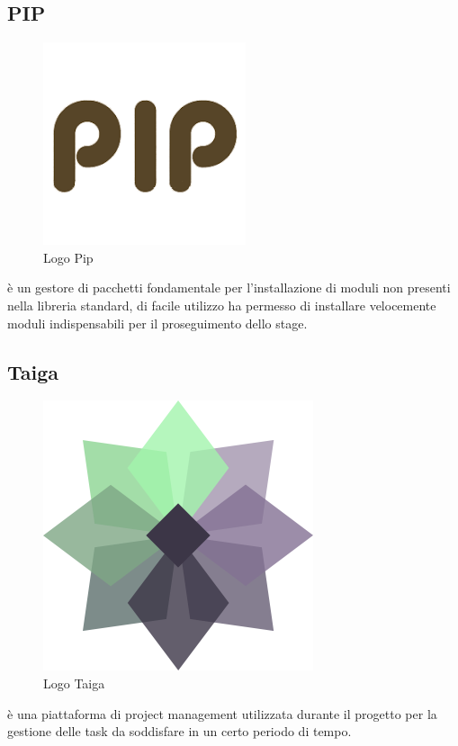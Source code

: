 \subsection{PIP}
\begin{figure}[H]
	\begin{center} \includegraphics[scale=0.2]{figures/pip}
		\caption[Logo Pip]{Logo Pip}
	\end{center}
\end{figure}
 è un gestore di pacchetti  fondamentale per l'installazione di moduli non presenti nella libreria standard, di facile utilizzo ha permesso di installare velocemente moduli indispensabili per il proseguimento dello stage.

\subsection{Taiga}
\begin{figure}[H]
	\begin{center} \includegraphics[scale=0.2]{figures/taiga}
		\caption[Logo Taiga]{Logo Taiga}
	\end{center}
\end{figure}
 è una piattaforma di project management utilizzata durante il progetto per la gestione delle task da soddisfare in un certo periodo di tempo.